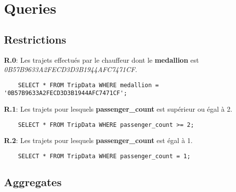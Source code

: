 \section{Queries}\label{sec:queries}


\subsection{Restrictions}\label{subsec:restrictions}



\textbf{R.0}: Les trajets effectués par le chauffeur dont le \textbf{medallion} est \textit{0B57B9633A2FECD3D3B1944AFC7471CF}.
\begin{verbatim}
    SELECT * FROM TripData WHERE medallion = '0B57B9633A2FECD3D3B1944AFC7471CF';
\end{verbatim}


\noindent\textbf{R.1}: Les trajets pour lesquels \textbf{passenger\_count} est supérieur ou égal à 2.
\begin{verbatim}
    SELECT * FROM TripData WHERE passenger_count >= 2;
\end{verbatim}



\noindent\textbf{R.2}: Les trajets pour lesquels \textbf{passenger\_count} est égal à 1.
\begin{verbatim}
    SELECT * FROM TripData WHERE passenger_count = 1;
\end{verbatim}

\subsection{Aggregates}\label{subsec:aggregates}

